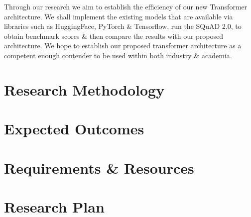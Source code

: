 \documentclass[11pt]{article}
\begin{document}
Through our research we aim to establish the efficiency of our new Transformer architecture. We shall implement the existing models that are available via libraries such as HuggingFace, PyTorch \& Tensorflow, run the SQuAD 2.0\cite{dataset}, to obtain benchmark scores \& then compare the results with our proposed architecture. We hope to establish our proposed transformer architecture as a competent enough contender to be used within both industry \& academia.
\section{Research Methodology}
\section{Expected Outcomes}
\section{Requirements \& Resources}
\section{Research Plan}


\end{document}
